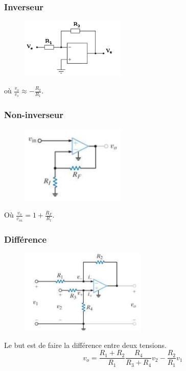 \documentclass{report}
\begin{document}
\subsubsection{Inverseur}
\begin{figure}[H]
\centering
\includegraphics[width=5cm]{img/Aopinverting.svg.png}
\end{figure}
où $\frac{v_o}{v_s} \approx - \frac{R_2}{R_1}$.

\subsubsection{Non-inverseur}
\begin{figure}[H]
\centering
\includegraphics[width=5cm]{img/nonInv2.png}
\end{figure}
Où $\frac{v_o}{v_{in}} = 1 + \frac{R_F}{R_l}$.

\subsubsection{Différence}
\begin{figure}[H]
\centering
\includegraphics[width=6cm]{img/dif.png}
\end{figure}
Le but est de faire la différence entre deux tensions. 
\begin{equation}
v_o = \frac{R_1 + R_2}{R_1} \frac{R_4}{R_3 + R_4} v_2 - \frac{R_2}{R_1} v_1
\end{equation}
\end{document}
